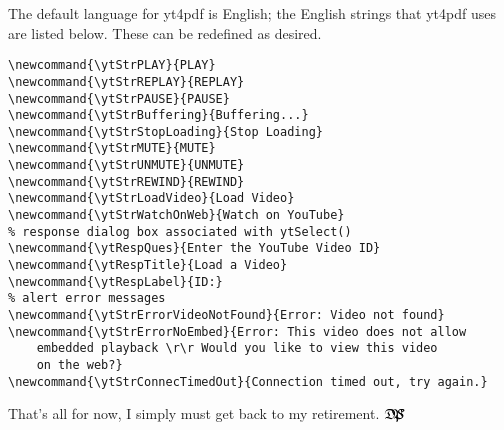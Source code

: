 \documentclass{article}
\def\dps{$\hbox{$\mathfrak D$\kern-.3em\hbox{$\mathfrak P$}%
   \kern-.6em \hbox{$\mathcal S$}}$}
\begin{document}
The default language for \textsf{yt4pdf} is English; the English strings
that \textsf{yt4pdf} uses are listed below. These can be redefined as
desired.
\begin{Verbatim}
\newcommand{\ytStrPLAY}{PLAY}
\newcommand{\ytStrREPLAY}{REPLAY}
\newcommand{\ytStrPAUSE}{PAUSE}
\newcommand{\ytStrBuffering}{Buffering...}
\newcommand{\ytStrStopLoading}{Stop Loading}
\newcommand{\ytStrMUTE}{MUTE}
\newcommand{\ytStrUNMUTE}{UNMUTE}
\newcommand{\ytStrREWIND}{REWIND}
\newcommand{\ytStrLoadVideo}{Load Video}
\newcommand{\ytStrWatchOnWeb}{Watch on YouTube}
% response dialog box associated with ytSelect()
\newcommand{\ytRespQues}{Enter the YouTube Video ID}
\newcommand{\ytRespTitle}{Load a Video}
\newcommand{\ytRespLabel}{ID:}
% alert error messages
\newcommand{\ytStrErrorVideoNotFound}{Error: Video not found}
\newcommand{\ytStrErrorNoEmbed}{Error: This video does not allow
    embedded playback \r\r Would you like to view this video
    on the web?}
\newcommand{\ytStrConnecTimedOut}{Connection timed out, try again.}
\end{Verbatim}

\bigskip

That's all for now, I simply must get back to my retirement. {\dps}
\end{document}
